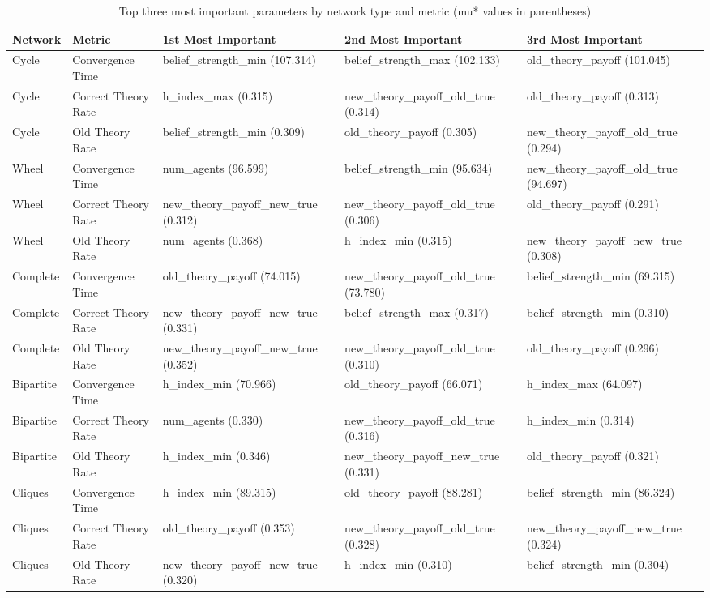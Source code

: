 \begin{table}
\caption{Top three most important parameters by network type and metric (mu* values in parentheses)}
\label{tab:sensitivity_summary}
\begin{tabular}{llp{3cm}p{3cm}p{3cm}}
\toprule
Network & Metric & 1st Most Important & 2nd Most Important & 3rd Most Important \\
\midrule
Cycle & Convergence Time & belief_strength_min (107.314) & belief_strength_max (102.133) & old_theory_payoff (101.045) \\
Cycle & Correct Theory Rate & h_index_max (0.315) & new_theory_payoff_old_true (0.314) & old_theory_payoff (0.313) \\
Cycle & Old Theory Rate & belief_strength_min (0.309) & old_theory_payoff (0.305) & new_theory_payoff_old_true (0.294) \\
Wheel & Convergence Time & num_agents (96.599) & belief_strength_min (95.634) & new_theory_payoff_old_true (94.697) \\
Wheel & Correct Theory Rate & new_theory_payoff_new_true (0.312) & new_theory_payoff_old_true (0.306) & old_theory_payoff (0.291) \\
Wheel & Old Theory Rate & num_agents (0.368) & h_index_min (0.315) & new_theory_payoff_new_true (0.308) \\
Complete & Convergence Time & old_theory_payoff (74.015) & new_theory_payoff_old_true (73.780) & belief_strength_min (69.315) \\
Complete & Correct Theory Rate & new_theory_payoff_new_true (0.331) & belief_strength_max (0.317) & belief_strength_min (0.310) \\
Complete & Old Theory Rate & new_theory_payoff_new_true (0.352) & new_theory_payoff_old_true (0.310) & old_theory_payoff (0.296) \\
Bipartite & Convergence Time & h_index_min (70.966) & old_theory_payoff (66.071) & h_index_max (64.097) \\
Bipartite & Correct Theory Rate & num_agents (0.330) & new_theory_payoff_old_true (0.316) & h_index_min (0.314) \\
Bipartite & Old Theory Rate & h_index_min (0.346) & new_theory_payoff_new_true (0.331) & old_theory_payoff (0.321) \\
Cliques & Convergence Time & h_index_min (89.315) & old_theory_payoff (88.281) & belief_strength_min (86.324) \\
Cliques & Correct Theory Rate & old_theory_payoff (0.353) & new_theory_payoff_old_true (0.328) & new_theory_payoff_new_true (0.324) \\
Cliques & Old Theory Rate & new_theory_payoff_new_true (0.320) & h_index_min (0.310) & belief_strength_min (0.304) \\
\bottomrule
\end{tabular}
\end{table}
